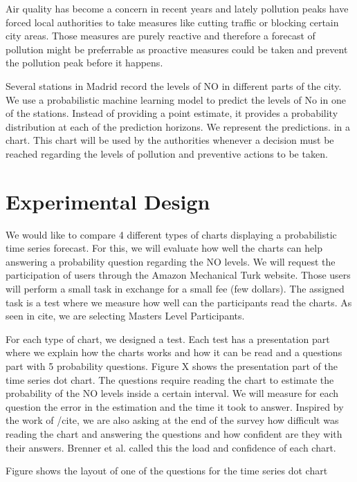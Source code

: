 \documentclass[a4paper,3p,sort&compress]{elsarticle}
\begin{document}
Air quality has become a concern in recent years and lately pollution peaks have forced local authorities to take measures like cutting traffic or blocking certain city areas. Those measures are purely reactive and therefore a forecast of pollution might be preferrable as proactive measures could be taken and prevent the pollution peak before it happens.

Several stations in Madrid record the levels of NO in different parts of the city. We use a probabilistic
machine learning model to predict the levels of No in one of the stations. Instead of providing a point estimate, it provides a probability distribution at each of the prediction horizons. We represent the predictions. in a chart. This chart will be used by the authorities whenever a decision must be reached regarding the levels of pollution and preventive actions to be taken.

\section{Experimental Design}
\label{sec:exp_design}

We would like to compare 4 different types of charts displaying a probabilistic time series forecast. For this, we will evaluate how well the charts can help answering a probability question regarding the NO levels. We will request the participation of users through the Amazon Mechanical Turk website. Those users will perform a small task in exchange for a small fee (few dollars). The assigned task is a test where we measure how well can the participants read the charts. As seen in cite, we are selecting Masters Level Participants.

For each type of chart, we designed a test. Each test has a presentation part where we explain how the charts works and how it can be read and a questions part with 5 probability questions. Figure X shows the presentation part of the time series dot chart. The questions require reading the chart to estimate the probability of the NO levels inside a certain interval. We will measure for each question the error in the estimation and the time it took to answer. Inspired by the work of /cite, we are also asking at the end of the survey how difficult was reading the chart and answering the questions and how confident are they with their answers. Brenner et al. called this the load and confidence of each chart.

Figure shows the layout of one of the questions for the time series dot chart
\end{document}
